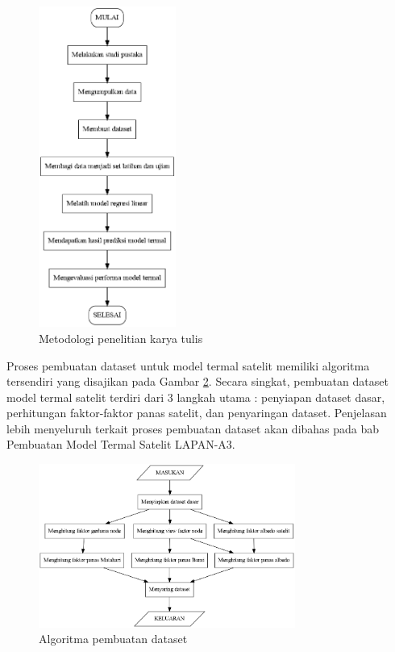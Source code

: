 \begin{figure}[H]
\setlength{}
\begin{center}
\includegraphics[width=0.4\textwidth]{fig/graph_metodologi.png}
\caption{Metodologi penelitian karya tulis}
\label{fig:metodologi}
\end{center}
\end{figure}

Proses pembuatan dataset untuk model termal satelit memiliki algoritma
tersendiri yang disajikan pada Gambar \ref{fig:algoritma}. Secara singkat,
pembuatan dataset model termal satelit terdiri dari 3 langkah utama : penyiapan
dataset dasar, perhitungan faktor-faktor panas satelit, dan penyaringan
dataset. Penjelasan lebih menyeluruh terkait proses pembuatan dataset akan
dibahas pada bab Pembuatan Model Termal Satelit LAPAN-A3.

\begin{figure}[H]
\setlength{}
\begin{center}
\includegraphics[width=0.75\textwidth]{fig/graph_algoritma.png}
\caption{Algoritma pembuatan dataset}
\label{fig:algoritma}
\end{center}
\end{figure}


